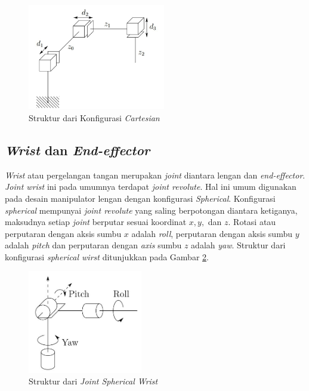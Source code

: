 \begin{figure}[H]
	\centering
	\includegraphics[width=6cm]{gambar/cartesian.jpg}
	\caption{Struktur dari Konfigurasi \textit{Cartesian}\cite{Spong2006}}
	\label{pic.cartesian}
\end{figure}

\subsection{ \textit{Wrist} dan \textit{End-effector} }

\textit{Wrist} atau pergelangan tangan merupakan \textit{joint} diantara lengan dan \textit{end-effector}. \textit{Joint wrist} ini pada umumnya terdapat \textit{joint revolute}. Hal ini umum digunakan pada desain manipulator lengan dengan konfigurasi \textit{Spherical}. Konfigurasi \textit{spherical} mempunyai \textit{joint revolute} yang saling berpotongan diantara ketiganya, maksudnya setiap \textit{joint} berputar sesuai koordinat $x, y, $ dan $z$. Rotasi atau perputaran dengan aksis sumbu $x$ adalah \textit{roll}, perputaran dengan aksis sumbu $y$ adalah \textit{pitch} dan perputaran dengan \textit{axis} sumbu $z$ adalah \textit{yaw}. Struktur dari konfigurasi \textit{spherical wirst} ditunjukkan pada Gambar \ref{pic.sphericalwirst}.
\begin{figure}[H]
	\centering
	\includegraphics[width=5cm]{gambar/wirst.jpg}
	\caption{Struktur dari \textit{Joint Spherical Wrist}\cite{Spong2006}}
	\label{pic.sphericalwirst}
\end{figure}


